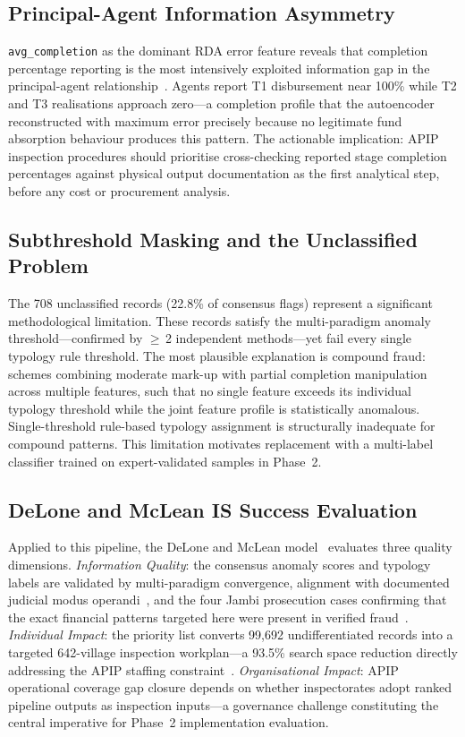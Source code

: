\documentclass[3p,times,procedia]{elsarticle}
\begin{document}
\subsection{Principal-Agent Information Asymmetry}

\texttt{avg\_completion} as the dominant RDA error feature reveals that completion percentage reporting is the most intensively exploited information gap in the principal-agent relationship~\cite{ref26}. Agents report T1 disbursement near 100\% while T2 and T3 realisations approach zero---a completion profile that the autoencoder reconstructed with maximum error precisely because no legitimate fund absorption behaviour produces this pattern. The actionable implication: APIP inspection procedures should prioritise cross-checking reported stage completion percentages against physical output documentation as the first analytical step, before any cost or procurement analysis.

\subsection{Subthreshold Masking and the Unclassified Problem}

The 708 unclassified records (22.8\% of consensus flags) represent a significant methodological limitation. These records satisfy the multi-paradigm anomaly threshold---confirmed by $\geq$\,2 independent methods---yet fail every single typology rule threshold. The most plausible explanation is compound fraud: schemes combining moderate mark-up with partial completion manipulation across multiple features, such that no single feature exceeds its individual typology threshold while the joint feature profile is statistically anomalous. Single-threshold rule-based typology assignment is structurally inadequate for compound patterns. This limitation motivates replacement with a multi-label classifier trained on expert-validated samples in Phase~2.

\subsection{DeLone and McLean IS Success Evaluation}

Applied to this pipeline, the DeLone and McLean model~\cite{ref10} evaluates three quality dimensions. \textit{Information Quality}: the consensus anomaly scores and typology labels are validated by multi-paradigm convergence, alignment with documented judicial modus operandi~\cite{ref13,ref14}, and the four Jambi prosecution cases confirming that the exact financial patterns targeted here were present in verified fraud~\cite{ref30,ref31,ref32,ref33}. \textit{Individual Impact}: the priority list converts 99,692 undifferentiated records into a targeted 642-village inspection workplan---a 93.5\% search space reduction directly addressing the APIP staffing constraint~\cite{ref12}. \textit{Organisational Impact}: APIP operational coverage gap closure depends on whether inspectorates adopt ranked pipeline outputs as inspection inputs---a governance challenge constituting the central imperative for Phase~2 implementation evaluation.
\end{document}
